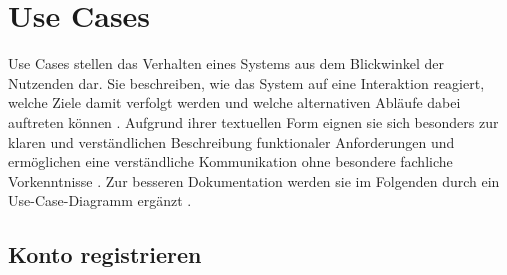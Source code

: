 \section{Use Cases}

Use Cases stellen das Verhalten eines Systems aus dem Blickwinkel der Nutzenden dar. Sie beschreiben, wie das System auf eine Interaktion reagiert, welche Ziele damit verfolgt werden und welche alternativen Abläufe dabei auftreten können \cite[S.~15]{cockburn2001}. Aufgrund ihrer textuellen Form eignen sie sich besonders zur klaren und verständlichen Beschreibung funktionaler Anforderungen und ermöglichen eine verständliche Kommunikation ohne besondere fachliche Vorkenntnisse \cite[S.~15]{cockburn2001}. Zur besseren Dokumentation werden sie im Folgenden durch ein Use-Case-Diagramm ergänzt \cite[S.~75]{pohl2021}.

\subsection{Konto registrieren}


